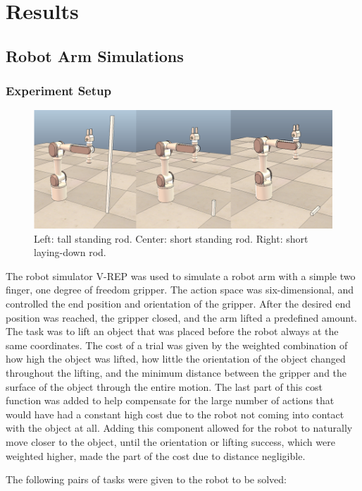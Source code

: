 \documentclass[12pt]{article}
\begin{document}
\section{Results}
\subsection{Robot Arm Simulations}
\subsubsection{Experiment Setup}

\begin{figure}[ht]
  \centering
  \includegraphics[width=0.9\columnwidth]{robots.png}
  \caption{\label{fig_label} Left: tall standing rod. Center: short standing rod. Right: short laying-down rod.
  \label{fig:robots}
  }
\end{figure}

The robot simulator V-REP was used to simulate a robot arm with a simple two finger, one degree of freedom gripper. The action space was six-dimensional, and controlled the end position and orientation of the gripper. After the desired end position was reached, the gripper closed, and the arm lifted a predefined amount. The task was to lift an object that was placed before the robot always at the same coordinates. The cost of a trial was given by the weighted combination of how high the object was lifted, how little the orientation of the object changed throughout the lifting, and the minimum distance between the gripper and the surface of the object through the entire motion. The last part of this cost function was added to help compensate for the large number of actions that would have had a constant high cost due to the robot not coming into contact with the object at all. Adding this component allowed for the robot to naturally move closer to the object, until the orientation or lifting success, which were weighted higher, made the part of the cost due to distance negligible. 

	The following pairs of tasks were given to the robot to be solved:
	
\end{document}
